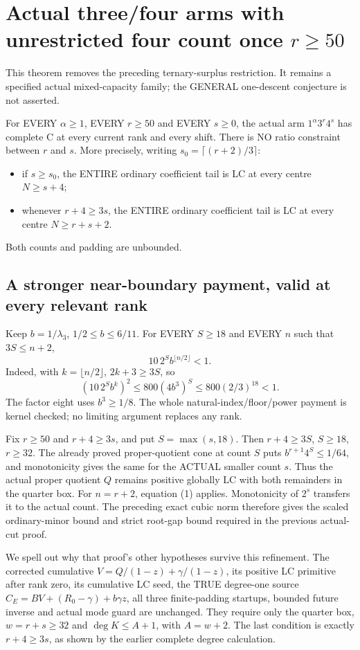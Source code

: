 \section{Actual three/four arms with unrestricted four count once $r\ge50$}
This theorem removes the preceding ternary-surplus restriction.
It remains a specified actual mixed-capacity family; the GENERAL
one-descent conjecture is not asserted.

\begin{theorem}
For EVERY $\alpha\ge1$, EVERY $r\ge50$ and EVERY $s\ge0$,
the actual arm $1^\alpha3^r4^s$ has complete C at every current
rank and every shift. There is NO ratio constraint between $r$ and $s$.
More precisely, writing $s_0=\lceil(r+2)/3\rceil$:
\begin{itemize}
\item if $s\ge s_0$, the ENTIRE ordinary coefficient tail is LC
at every centre $N\ge s+4$;
\item whenever $r+4\ge3s$, the ENTIRE ordinary coefficient tail is
LC at every centre $N\ge r+s+2$.
\end{itemize}
Both counts and padding are unbounded.
\end{theorem}

\subsection{A stronger near-boundary payment, valid at every relevant rank}
Keep $b=1/\lambda_3$, $1/2\le b\le6/11$.
For EVERY $S\ge18$ and EVERY $n$ such that $3S\le n+2$,
\[
                         10\,2^S b^{\lfloor n/2\rfloor}<1.       \tag{1}
\]
Indeed, with $k=\lfloor n/2\rfloor$, $2k+3\ge3S$, so
\[
 (10\,2^Sb^k)^2\le800(4b^3)^S
 \le800(2/3)^{18}<1.
\]
The factor eight uses $b^3\ge1/8$. The whole natural-index/floor/power
payment is kernel checked; no limiting argument replaces any rank.

Fix $r\ge50$ and $r+4\ge3s$, and put $S=\max(s,18)$.
Then $r+4\ge3S$, $S\ge18$, $r\ge32$.
The already proved proper-quotient cone at count $S$ puts
$b^{r+1}4^S\le1/64$, and monotonicity gives the same for the ACTUAL
smaller count $s$. Thus the actual proper quotient $Q$ remains positive
globally LC with both remainders in the quarter box.
For $n=r+2$, equation (1) applies. Monotonicity of $2^s$ transfers
it to the actual count. The preceding exact cubic norm therefore gives
the scaled ordinary-minor bound and strict root-gap bound required
in the previous actual-cut proof.

We spell out why that proof's other hypotheses survive this refinement.
The corrected cumulative $V=Q/(1-z)+\gamma/(1-z)$, its positive LC
primitive after rank zero, its cumulative LC seed, the TRUE degree-one
source $C_E=BV+(R_0-\gamma)+b\gamma z$, all three finite-padding
startups, bounded future inverse and actual mode guard are unchanged.
They require only the quarter box, $w=r+s\ge32$ and
$\deg K\le A+1$, with $A=w+2$. The last condition is exactly
$r+4\ge3s$, as shown by the earlier complete degree calculation.

